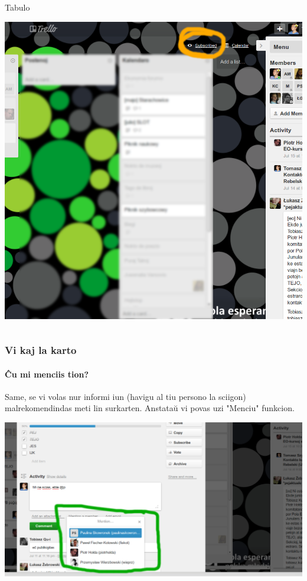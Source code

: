 \documentclass{beamer}
\begin{document}
\begin{frame}
\begin{columns}
\begin{block}{Tabulo}
\begin{center}
    		\includegraphics[scale=0.10]{ekranoj/abonu-tabulon}
    		\end{center}
    	\end{block}

	\end{columns}
  \end{frame}


  \begin{frame}
    \frametitle{Vi kaj la karto}
    \framesubtitle{Ĉu mi menciis tion?}
		
	Same, se vi volas nur informi iun (havigu al tiu persono la sciigon) malrekomendindas meti lin surkarten. Anstataŭ vi povas uzi "Menciu" funkcion.
\begin{center}

	\includegraphics[scale=0.24]{ekranoj/mencio}

\end{center}
  \end{frame}
\end{document}
